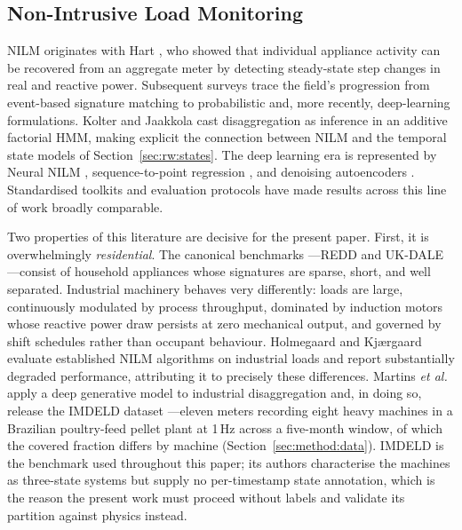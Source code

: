 \subsection{Non-Intrusive Load Monitoring}
\label{sec:rw:nilm}

NILM originates with Hart \cite{hart1992nonintrusive}, who showed that
individual appliance activity can be recovered from an aggregate meter
by detecting steady-state step changes in real and reactive power.
Subsequent surveys \cite{zeifman2011nilm,schirmer2023nilmreview} trace
the field's progression from event-based signature matching to
probabilistic and, more recently, deep-learning formulations. Kolter
and Jaakkola \cite{kolter2012afamap} cast disaggregation as inference in
an additive factorial HMM, making explicit the connection between NILM
and the temporal state models of Section~\ref{sec:rw:states}. The deep
learning era is represented by Neural NILM \cite{kelly2015neuralnilm},
sequence-to-point regression \cite{zhang2018seq2point}, and denoising
autoencoders \cite{bonfigli2018denoising}. Standardised toolkits
\cite{batra2014nilmtk} and evaluation protocols
\cite{makonin2015performance} have made results across this line of
work broadly comparable.

Two properties of this literature are decisive for the present paper.
First, it is overwhelmingly \emph{residential}. The canonical benchmarks
---REDD \cite{kolter2011redd} and UK-DALE---consist of household
appliances whose signatures are sparse, short, and well separated.
Industrial machinery behaves very differently: loads are large,
continuously modulated by process throughput, dominated by induction
motors whose reactive power draw persists at zero mechanical output, and
governed by shift schedules rather than occupant behaviour. Holmegaard
and Kj\ae{}rgaard \cite{holmegaard2016industrial} evaluate established
NILM algorithms on industrial loads and report substantially degraded
performance, attributing it to precisely these differences. Martins
\textit{et al.} \cite{martins2018imdeld} apply a deep generative model
to industrial disaggregation and, in doing so, release the IMDELD
dataset \cite{imdeld2018dataset}---eleven meters recording eight heavy
machines in a Brazilian poultry-feed pellet plant at 1\,Hz across a
five-month window, of which the covered fraction differs by machine
(Section~\ref{sec:method:data}). IMDELD is the benchmark used throughout this
paper; its authors characterise the machines as three-state systems but
supply no per-timestamp state annotation, which is the reason the
present work must proceed without labels and validate its partition
against physics instead.

